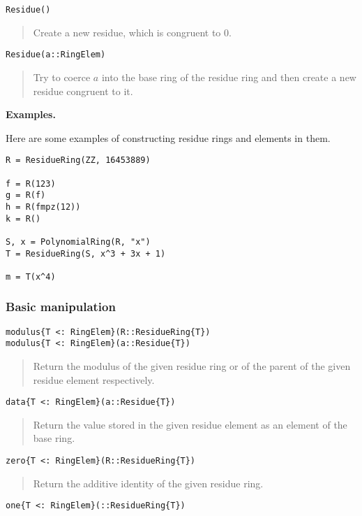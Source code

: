\documentclass[a4paper,10pt]{article}
\newcommand{\desc}[1]{\vspace{-3mm}\begin{quote}#1\end{quote}}
\begin{document}
\begin{lstlisting}
Residue()
\end{lstlisting}

\desc{Create a new residue, which is congruent to $0$.}

\begin{lstlisting}
Residue(a::RingElem)
\end{lstlisting}

\desc{Try to coerce $a$ into the base ring of the residue ring and then
create a new residue congruent to it.}

\textbf{Examples.}

Here are some examples of constructing residue rings and elements in them.

\begin{lstlisting}
R = ResidueRing(ZZ, 16453889)

f = R(123)
g = R(f)
h = R(fmpz(12))
k = R()

S, x = PolynomialRing(R, "x")
T = ResidueRing(S, x^3 + 3x + 1)

m = T(x^4)
\end{lstlisting}

\subsubsection{Basic manipulation}

\begin{lstlisting}
modulus{T <: RingElem}(R::ResidueRing{T})
modulus{T <: RingElem}(a::Residue{T})
\end{lstlisting}

\desc{Return the modulus of the given residue ring or of the parent of the given
residue element respectively.}

\begin{lstlisting}
data{T <: RingElem}(a::Residue{T})
\end{lstlisting}

\desc{Return the value stored in the given residue element as an element of the
base ring.}

\begin{lstlisting}
zero{T <: RingElem}(R::ResidueRing{T})
\end{lstlisting}

\desc{Return the additive identity of the given residue ring.}

\begin{lstlisting}
one{T <: RingElem}(::ResidueRing{T})
\end{lstlisting}
\end{document}

